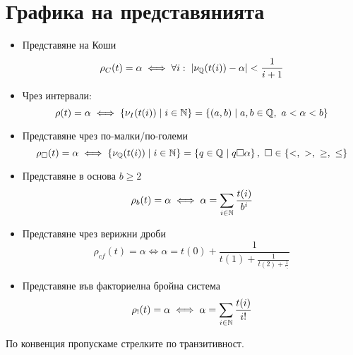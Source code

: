 \section{Графика на представянията}
\begin{itemize}
    \item Представяне на Коши
          \begin{equation}
              \rho_C(t) = \alpha \iff \forall i:\; \left|\nu_{\mathbb{Q}}(t(i)) - \alpha\right| < \frac{1}{i+1}
          \end{equation}
    \item Чрез интервали:
          \begin{equation}
              \rho(t) = \alpha \iff \left\{\nu_I(t(i)) \mid i\in {\mathbb{N}} \right\} = \left\{(a, b) \mid a,b\in{\mathbb{Q}},\ a < \alpha < b\right\}
          \end{equation}
    \item Представяне чрез по-малки/по-големи
          \begin{equation}
              \rho_\square(t) = \alpha \iff \left\{ \nu_\Q(t(i)) \mid i \in \N \right\} =  \left\{ q \in \Q \mid q \square \alpha \right\},\ \square \in \{<,\ >,\ \geq,\ \leq\}
          \end{equation}
    \item Представяне в основа $b \geq 2$
          \begin{equation}
              \rho_b(t) = \alpha \iff \alpha = \sum\limits_{i\in{\mathbb{N}}} \frac{t(i)}{b^i}
          \end{equation}
    \item Представяне чрез верижни дроби
          \begin{equation}
              \rho_{cf}(t) = \alpha \iff \alpha = t(0) + \frac{1}{t(1) + \frac{1}{t(2) + \frac{1}{\ddots}}}
          \end{equation}
    \item Представяне във факториелна бройна система
          \begin{equation}
              \rho_!(t) = \alpha \iff \alpha = \sum\limits_{i\in{\mathbb{N}}} \frac{t(i)}{i!}
          \end{equation}
\end{itemize}

По конвенция пропускаме стрелките по транзитивност.


